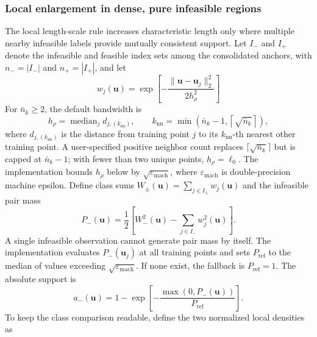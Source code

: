 \documentclass[twoside]{article}
\begin{document}
\subsubsection{Local enlargement in dense, pure infeasible regions}

The local length-scale rule increases characteristic length only where multiple
nearby infeasible labels provide mutually consistent support.  Let
\(I_-\) and \(I_+\) denote the infeasible and feasible
index sets among the consolidated anchors, with \(n_-=|I_-|\) and
\(n_+=|I_+|\), and let
\begin{equation}
  w_j(\mathbf{u})=
  \exp\!\left[-\frac{\|\mathbf{u}-\mathbf{u}_j\|_2^2}{2h_\rho^2}\right]
  \label{eq:density-weight}
\end{equation}
For \(\bar n_k\geq2\), the default bandwidth is
\begin{equation}
  h_\rho=\operatorname{median}_{j}
  d_{j,(k_{\mathrm{nn}})},\qquad
  k_{\mathrm{nn}}=\min\!\left(\bar n_k-1,
  \left\lceil\sqrt{\bar n_k}\right\rceil\right),
  \label{eq:density-bandwidth}
\end{equation}
where \(d_{j,(k_{\mathrm{nn}})}\) is the distance from training point \(j\) to its
\(k_{\mathrm{nn}}\)-th nearest other training point. A user-specified positive neighbor
count replaces \(\lceil\sqrt{\bar n_k}\rceil\) but is capped at
\(\bar n_k-1\); with fewer than two unique points, \(h_\rho=\ell_0\). The
implementation bounds \(h_\rho\) below by
\(\sqrt{\varepsilon_{\mathrm{mach}}}\), where
\(\varepsilon_{\mathrm{mach}}\) is double-precision machine epsilon. Define class sums
\(W_\pm(\mathbf{u})=\sum_{j\in I_\pm}w_j(\mathbf{u})\) and
the infeasible pair mass
\begin{equation}
  P_-(\mathbf{u})
  =\frac{1}{2}\left[
  W_-^2(\mathbf{u})-
  \sum_{j\in I_-}w_j^2(\mathbf{u})
  \right].
  \label{eq:pair-mass}
\end{equation}
A single infeasible observation cannot generate pair mass by itself. The implementation
evaluates \(P_-(\mathbf{u}_j)\) at all training points and sets
\(P_{\mathrm{ref}}\) to the median of values exceeding
\(\sqrt{\varepsilon_{\mathrm{mach}}}\). If none exist, the fallback is
\(P_{\mathrm{ref}}=1\).  The absolute support is
\begin{equation}
  a_-(\mathbf{u})
  =1-\exp\!\left[
  -\frac{\max(0,P_-(\mathbf{u}))}{P_{\mathrm{ref}}}
  \right].
  \label{eq:absolute-support}
\end{equation}
To keep the class comparison readable, define the two normalized local
densities as
\end{document}
